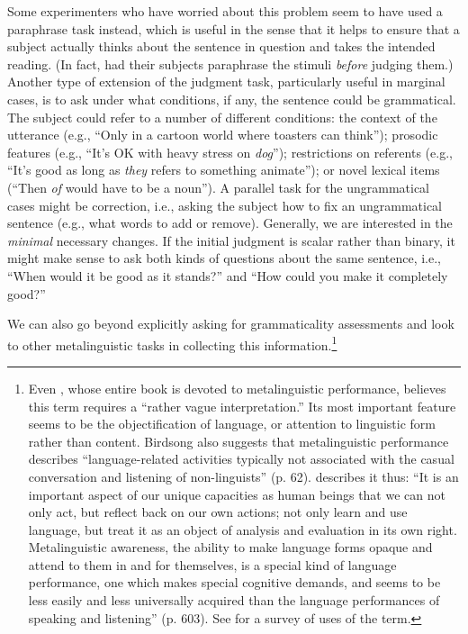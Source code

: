 Some experimenters  who have worried  about this problem seem to have used a paraphrase task instead, which is useful in the sense that it helps to ensure that a subject actually thinks about the sentence in question and takes the intended reading. (In fact, \citet{ConnorsEtAl1993} had their  subjects paraphrase  the stimuli \textit{before} judging them.) Another type of extension of the judgment task, particularly useful  in marginal  cases, is to ask under  what  conditions, if  any, the sentence could be grammatical. The subject could refer to a number  of different  conditions: the context of the utterance (e.g., ``Only in a cartoon world where toasters can think''); prosodic features (e.g., ``It's OK with heavy stress on \textit{dog}''); restrictions on referents  (e.g., ``It's good as long as \textit{they} refers to something animate''); or novel lexical items (``Then \textit{of} would have to be a noun''). A parallel task for the ungrammatical cases might be correction, i.e., asking the subject how to fix an ungrammatical sentence (e.g., what words to add or remove). Generally, we are interested in the \textit{minimal} necessary  changes. If the initial judgment  is scalar rather than binary, it might make sense to ask both kinds of questions about the same sentence, i.e., ``When would it be good as it stands?'' and ``How could you make it completely  good?''

We can also go beyond explicitly asking for grammaticality assessments and look to other metalinguistic tasks in collecting this information.\footnote{Even \citet{Birdsong1989}, whose entire book is devoted to metalinguistic performance, believes this term requires a ``rather vague interpretation.'' Its most important feature seems to be the objectification of language, or attention to linguistic form rather than content. Birdsong also suggests that metalinguistic performance describes ``language-related activities typically not associated with the casual conversation and listening of non-linguists'' (p. 62). \citet{Cazden1976} describes it thus: ``It is an important aspect of our unique capacities as human beings that we can not only act, but reflect back
on our own actions; not only learn and use language, but treat it as an object of analysis and evaluation in its own right. Metalinguistic awareness, the ability to make language forms opaque and attend to them in and for themselves, is a special kind of language performance, one which makes special cognitive demands, and seems to be less easily and less universally acquired than the language performances of speaking and listening'' (p. 603). See \citet{Gombert1992} for a survey of uses of the term.}

